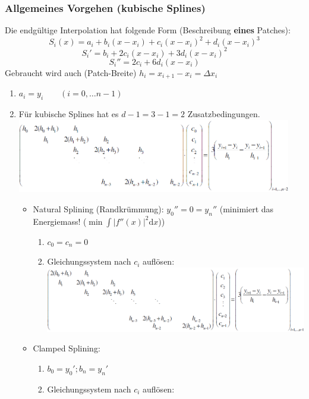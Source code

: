 \subsubsection{Allgemeines Vorgehen (kubische Splines)}
Die endgültige Interpolation hat folgende Form (Beschreibung \textbf{eines} Patches):
$$\boxed{S_i(x) = a_i + b_i(x-x_i) + c_i(x-x_i)^2 + d_i(x-x_i)^3}$$
$$S_i' = b_i + 2c_i(x-x_i)+3d_i(x-x_i)^2$$
$$S_i'' = 2c_i + 6 d_i (x-x_i)$$
Gebraucht wird auch (Patch-Breite) $h_i = x_{i+1} - x_i = \Delta x_i$ 
\begin{enumerate}
  \item $a_i = y_i \qquad (i=0,\ldots n-1)$
  \item Für kubische Splines hat es $d-1=3-1=2$ Zusatzbedingungen.\\ \includegraphics[width=12cm]{./bilder/1d_spline_gleichungssystem}
\newpage
    \begin{itemize}
      \item Natural Splining (Randkrümmung): $y_0''=0=y_n''$ (minimiert das Energiemass! ($\min \int |f''(x)|^2 \mathrm{d}x$))
        \begin{enumerate}
          \item $c_0 = c_n = 0$
          \item Gleichungssystem nach $c_i$ auflösen:\\
            \includegraphics[width=13cm]{./bilder/1d_spline_natural_gleichungssystem}
        \end{enumerate}        
       \item Clamped Splining:
         \begin{enumerate}
           \item $b_0 = y_0'; b_n=y_n'$
           \item Gleichungssystem nach $c_i$ auflösen:\\

\end{enumerate}
\end{itemize}
\end{enumerate}
